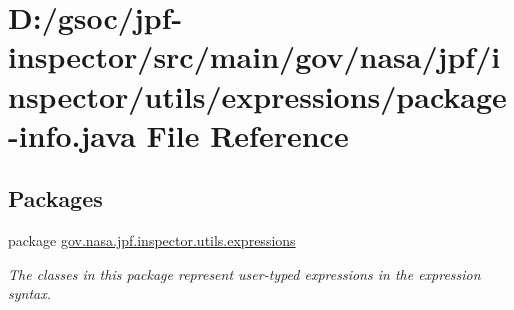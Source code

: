 \hypertarget{utils_2expressions_2package-info_8java}{}\section{D\+:/gsoc/jpf-\/inspector/src/main/gov/nasa/jpf/inspector/utils/expressions/package-\/info.java File Reference}
\label{utils_2expressions_2package-info_8java}
\subsection*{Packages}
\begin{DoxyCompactItemize}
\item 
package \hyperlink{namespacegov_1_1nasa_1_1jpf_1_1inspector_1_1utils_1_1expressions}{gov.\+nasa.\+jpf.\+inspector.\+utils.\+expressions}
\begin{DoxyCompactList}\small\item\em The classes in this package represent user-\/typed expressions in the expression syntax. \end{DoxyCompactList}\end{DoxyCompactItemize}
